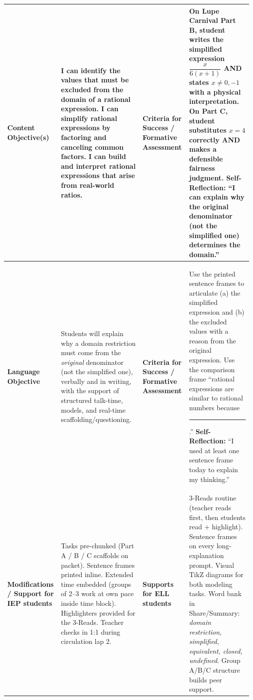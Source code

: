 \documentclass[10pt]{article}
\begin{document}
\vspace{-1.2pt}
\noindent
\begin{tabularx}{\linewidth}{|>{\bfseries\RaggedRight\arraybackslash}p{1.7in}|Y|>{\bfseries\RaggedRight\arraybackslash}p{1.7in}|Y|}
  \hline
  Content Objective(s) &
    I can identify the values that must be excluded from the domain of a
    rational expression. I can simplify rational expressions by factoring
    and canceling common factors. I can build and interpret rational
    expressions that arise from real-world ratios.
  & Criteria for Success / Formative Assessment &
    On Lupe Carnival Part B, student writes the simplified expression
    $\dfrac{x}{6(x+1)}$ AND states $x \neq 0, -1$ with a physical
    interpretation. On Part C, student substitutes $x = 4$ correctly
    AND makes a defensible fairness judgment.
    \newline\smallskip
    \textbf{Self-Reflection:} ``I can explain why the original denominator
    (not the simplified one) determines the domain.'' \\ \hline
  Language Objective &
    Students will explain why a domain restriction must come from the
    \emph{original} denominator (not the simplified one), verbally and
    in writing, with the support of structured talk-time, models, and
    real-time scaffolding/questioning.
  & Criteria for Success / Formative Assessment &
    Use the printed sentence frames to articulate (a) the simplified
    expression and (b) the excluded values with a reason from the
    original expression. Use the comparison frame ``rational expressions
    are similar to rational numbers because \rule{0.6in}{0.4pt}.''
    \newline\smallskip
    \textbf{Self-Reflection:} ``I used at least one sentence frame today
    to explain my thinking.'' \\ \hline
  Modifications / Support for IEP students &
    Tasks pre-chunked (Part A / B / C scaffolds on packet). Sentence
    frames printed inline. Extended time embedded (groups of 2--3 work
    at own pace inside time block). Highlighters provided for the
    3-Reads. Teacher checks in 1:1 during circulation lap 2.
  & Supports for ELL students &
    3-Reads routine (teacher reads first, then students read +
    highlight). Sentence frames on every long-explanation prompt.
    Visual TikZ diagrams for both modeling tasks. Word bank in
    Share/Summary: \emph{domain restriction, simplified, equivalent,
    closed, undefined}. Group A/B/C structure builds peer support. \\ \hline
\end{tabularx}
\end{document}
